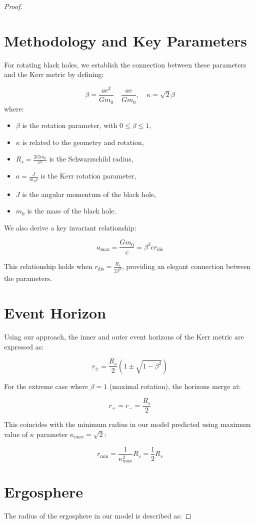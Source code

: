 \documentclass{article}
\begin{document}
\begin{theorem}
\begin{proof}
\section{Methodology and Key Parameters}

For rotating black holes, we establish the connection between these parameters and the Kerr metric by defining:

\[
\beta =\frac{ac^{2}}{Gm_{0}}  \quad \frac{a c}{G m_0}, \quad \kappa = \sqrt{2} \beta
\]
where:
\begin{itemize}
    \item \(\beta\) is the rotation parameter, with \(0 \leq \beta \leq 1\),
    \item \(\kappa\) is related to the geometry and rotation,
    \item \(R_s = \frac{2 G m_0}{c^2}\) is the Schwarzschild radius,
    \item \(a = \frac{J}{m_0 c}\) is the Kerr rotation parameter,
    \item \(J\) is the angular momentum of the black hole,
    \item \(m_0\) is the mass of the black hole.
\end{itemize}

We also derive a key invariant relationship:

\[
a_{\max} = \frac{G m_0}{c} = \beta^2 c r_{\text{dis}}
\]

This relationship holds when \(r_{\text{dis}} = \frac{R_s}{2 \beta^2}\), providing an elegant connection between the parameters.

\section{Event Horizon}
Using our approach, the inner and outer event horizons of the Kerr metric are expressed as:

\[
r_{\pm} = \frac{R_s}{2} \left(1 \pm \sqrt{1 - \beta^2}\right)
\]

For the extreme case where \(\beta = 1\) (maximal rotation), the horizons merge at:

\[
r_{+} = r_{-} = \frac{R_s}{2}
\]

This coincides with the minimum radius in our model predicted using maximum value of $\kappa$ parameter $\kappa_{max}=\sqrt{2}$:

\[
r_{\min} = \frac{1}{\kappa_{max}^2} R_s = \frac{1}{2} R_s
\]

\section{Ergosphere}
The radius of the ergosphere in our model is described as:


\end{proof}
\end{theorem}
\end{document}
